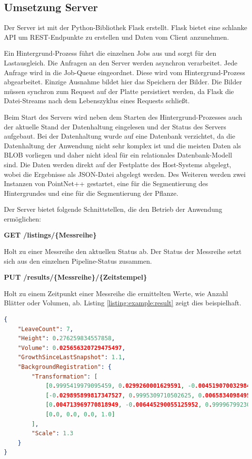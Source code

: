 \documentclass[12pt,titlepage, twoside]{article}
\begin{document}
\subsection{Umsetzung Server}
\label{sec:realisierung:implementierung4}

Der Server ist mit der Python-Bibliothek Flask erstellt. Flask bietet eine schlanke API um REST-Endpunkte zu erstellen und Daten vom Client anzunehmen. 

Ein Hintergrund-Prozess führt die einzelnen Jobs aus und sorgt für den Lastausgleich. Die Anfragen an den Server werden asynchron verarbeitet. 
Jede Anfrage wird in die Job-Queue eingeordnet. Diese wird vom Hintergrund-Prozess abgearbeitet.
Einzige Ausnahme bildet hier das Speichern der Bilder. Die Bilder müssen synchron zum Request auf der Platte persistiert werden, da Flask die Datei-Streams nach dem Lebenszyklus eines Requests schließt.

Beim Start des Servers wird neben dem Starten des Hintergrund-Prozesses auch der aktuelle Stand der Datenhaltung eingelesen und der Status des Servers aufgebaut. 
Bei der Datenhaltung wurde auf eine Datenbank verzichtet, da die Datenhaltung der Anwendung nicht sehr komplex ist und die meisten Daten als BLOB \cite{sears2007blob} vorliegen und daher nicht ideal für ein relationales Datenbank-Modell sind. 
Die Daten werden direkt auf der Festplatte des Host-Systems abgelegt, wobei die Ergebnisse als JSON-Datei abgelegt werden.
Des Weiteren werden zwei Instanzen von PointNet++ gestartet, eine für die Segmentierung des Hintergrundes und eine für die Segmentierung der Pflanze.

Der Server bietet folgende Schnittstellen, die den Betrieb der Anwendung ermöglichen:

\textbf{GET /listings/\{Messreihe\}}

Holt zu einer Messreihe den aktuellen Status ab. Der Status der Messreihe setzt sich aus den einzelnen Pipeline-Status zusammen.

\textbf{PUT /results/\{Messreihe\}/\{Zeitstempel\}}

Holt zu einem Zeitpunkt einer Messreihe die ermittelten Werte, wie Anzahl Blätter oder Volumen, ab. Listing \ref{listing:example:result} zeigt dies beispielhaft.

\begin{lstlisting}[language=json, caption={Beispiel Ergebnisse eines Zeitstempels}, captionpos=b, label=listing:example:result]
{
    "LeaveCount": 7,
    "Height": 0.276259834557858,
    "Volume": 0.025656320729475497,
    "GrowthSinceLastSnapshot": 1.1,
    "BackgroundRegistration": {
        "Transformation": [
            [0.9995419979095459, 0.0299260001629591, -0.004519070032984018, -0.030479200184345245], 
            [-0.029895899817347527, 0.9995309710502625, 0.0065834098495543, 0.025272000581026077], 
            [0.004713969770818949, -0.006445290055125952, 0.9999679923057556, 0.0013244400033727288], 
            [0.0, 0.0, 0.0, 1.0]
        ],
        "Scale": 1.3
    }
}
\end{lstlisting}
\end{document}
